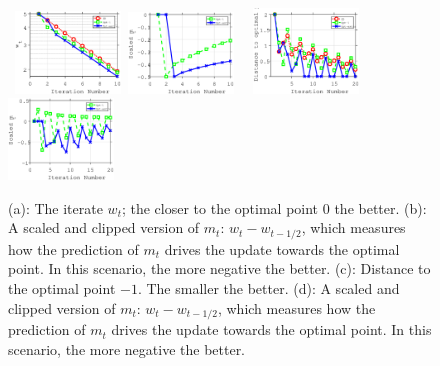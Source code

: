 \documentclass[11pt]{article}
\theoremstyle{k}
\begin{document}
\begin{figure}[t]
\centering
    \mbox{
    \includegraphics[width=0.25\textwidth]{./simulation/fig/fig1_left.eps}
    \includegraphics[width=0.25\textwidth]{simulation/fig/fig1_right.eps}
    }
    \mbox{
    \includegraphics[width=0.25\textwidth]{./simulation/fig/fig2_left.eps}
    \includegraphics[width=0.25\textwidth]{simulation/fig/fig2_right.eps}
    }
     \caption{\small (a): The iterate $w_t$; the closer to the optimal point $0$ the better. (b): A scaled and clipped version of $m_t$: $w_t - w_{t-1/2}$, which measures how the prediction of $m_t$ drives the update towards the optimal point. In this scenario, the more negative the better.
     (c): Distance to the optimal point $-1$. The smaller the better. (d): A scaled and clipped version of $m_t$: $w_t - w_{t-1/2}$, which measures how the prediction of $m_t$ drives
the update towards the optimal point. In this scenario, the more negative the better.
     }
     \label{simu}
\vspace{-0.2in}
\end{figure}
\end{document}
